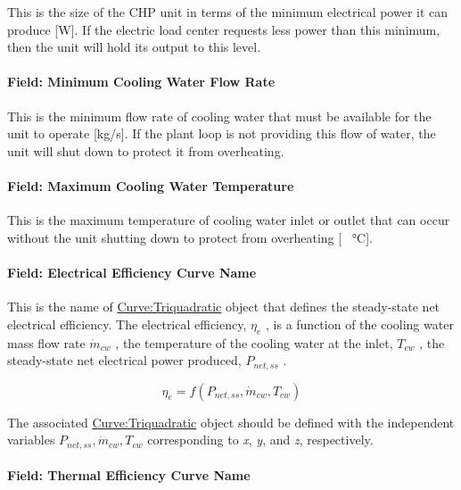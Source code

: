 This is the size of the CHP unit in terms of the minimum electrical power it can produce {[}W{]}. If the electric load center requests less power than this minimum, then the unit will hold its output to this level.

\paragraph{Field: Minimum Cooling Water Flow Rate}\label{field-minimum-cooling-water-flow-rate}

This is the minimum flow rate of cooling water that must be available for the unit to operate {[}kg/s{]}. If the plant loop is not providing this flow of water, the unit will shut down to protect it from overheating.

\paragraph{Field: Maximum Cooling Water Temperature}\label{field-maximum-cooling-water-temperature}

This is the maximum temperature of cooling water inlet or outlet that can occur without the unit shutting down to protect from overheating {[} \SI{}{\celsius}{]}.

\paragraph{Field: Electrical Efficiency Curve Name}\label{field-electrical-efficiency-curve-name}

This is the name of \hyperref[curvetriquadratic]{Curve:Triquadratic} object that defines the steady-state net electrical efficiency. The electrical efficiency, \(\eta_e\) , is a function of the cooling water mass flow rate \(\dot m_{cw}\) , the temperature of the cooling water at the inlet, \(T_{cw}\) , the steady-state net electrical power produced, \(P_{net,ss}\) .

\begin{equation}
\eta_e = f\left( {{P_{net,ss}},{{\dot m}_{cw}},{T_{cw}}} \right)
\end{equation}

The associated \hyperref[curvetriquadratic]{Curve:Triquadratic} object should be defined with the independent variables \({P_{net,ss}},{\dot m_{cw}},{T_{cw}}\) corresponding to \emph{x}, \emph{y}, and \emph{z}, respectively.

\paragraph{Field: Thermal Efficiency Curve Name}\label{field-thermal-efficiency-curve-name}

